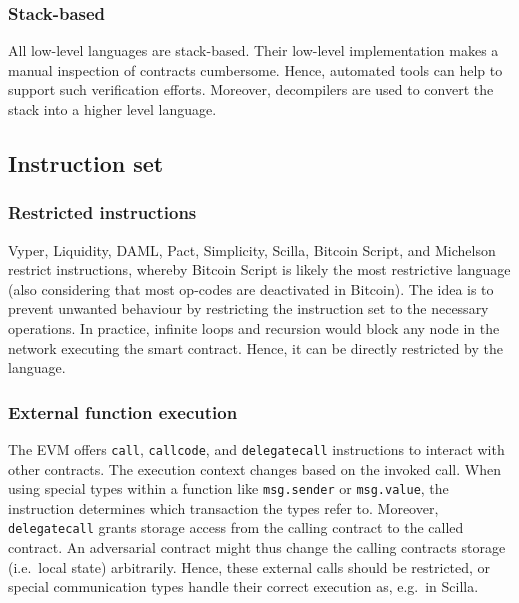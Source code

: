 \subsubsection{Stack-based}
All low-level languages are stack-based. Their low-level implementation makes a manual inspection of contracts cumbersome. Hence, automated tools can help to support such verification efforts. Moreover, decompilers are used to convert the stack into a higher level language.

\subsection{Instruction set}
\subsubsection{Restricted instructions}
Vyper, Liquidity, DAML, Pact, Simplicity, Scilla, Bitcoin Script, and Michelson restrict instructions, whereby Bitcoin Script is likely the most restrictive language (also considering that most op-codes are deactivated in Bitcoin). 
The idea is to prevent unwanted behaviour by restricting the instruction set to the necessary operations.
In practice, infinite loops and recursion would block any node in the network executing the smart contract. Hence, it can be directly restricted by the language.

\subsubsection{External function execution}
The EVM offers \texttt{call}, \texttt{callcode}, and \texttt{delegatecall} instructions to interact with other contracts. The execution context changes based on the invoked call. When using special types within a function like \texttt{msg.sender} or \texttt{msg.value}, the instruction determines which transaction the types refer to. Moreover, \texttt{delegatecall} grants storage access from the calling contract to the called contract. An adversarial contract might thus change the calling contracts storage (i.e.\ local state) arbitrarily. Hence, these external calls should be restricted, or special communication types handle their correct execution as, e.g.\ in Scilla.

